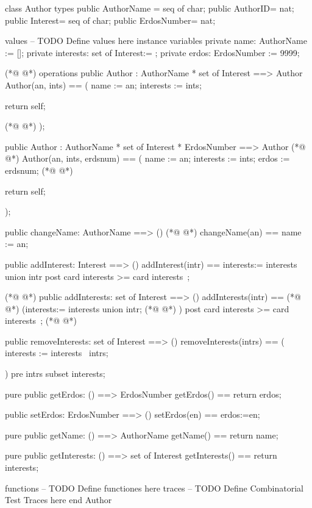 \begin{vdmpp}[breaklines=true]
class Author
types
public AuthorName = seq of char;
public AuthorID= nat;
public Interest= seq of char;
public ErdosNumber= nat;


values
-- TODO Define values here
instance variables
 private name: AuthorName := [];
 private interests: set of Interest:= {};
private erdos: ErdosNumber := 9999;


(*@
\label{Author:17}
@*)
operations
 public Author : AuthorName *
          set of Interest ==> Author
  Author(an, ints) ==
  (
  name := an;
  interests := ints;
  
  return self;
  
(*@
\label{changeName:27}
@*)
  );
  
  public Author : AuthorName *
          set of Interest * ErdosNumber  ==> Author
(*@
\label{addInterest:31}
@*)
  Author(an, ints, erdsnum) ==
  (
  name := an;
  interests := ints;
  erdos := erdsnum;
(*@
\label{addInterests:36}
@*)
  
  return self;
  
  );
 
 public changeName: AuthorName ==> ()
(*@
\label{removeInterests:42}
@*)
 changeName(an) ==
 name :=  an;
 
 
 
 public addInterest: Interest ==> ()
  addInterest(intr) ==
  interests:= interests union {intr}
  post card interests >= card interests~;
  
(*@
\label{getName:52}
@*)
 public addInterests: set of Interest ==> ()
  addInterests(intr) ==
(*@
\label{getErdos:54}
@*)
  (interests:= interests union intr;
(*@
\label{getInterests:55}
@*)
  )
  post card interests >= card interests~;
(*@
\label{setErdos:57}
@*)
  
 public removeInterests: set of Interest ==> ()
  removeInterests(intrs) == 
   ( interests := interests \ intrs;
    
   )
   pre intrs subset interests;
   
 
 pure public getErdos: () ==> ErdosNumber
 getErdos() == return erdos;
 
 public setErdos: ErdosNumber ==> ()
  setErdos(en) ==
  erdos:=en;
  
  
 pure public getName: () ==> AuthorName
  getName() == return name;
  
 pure public getInterests: () ==> set of Interest
  getInterests() == return interests;



functions
-- TODO Define functiones here
traces
-- TODO Define Combinatorial Test Traces here
end Author
\end{vdmpp}
